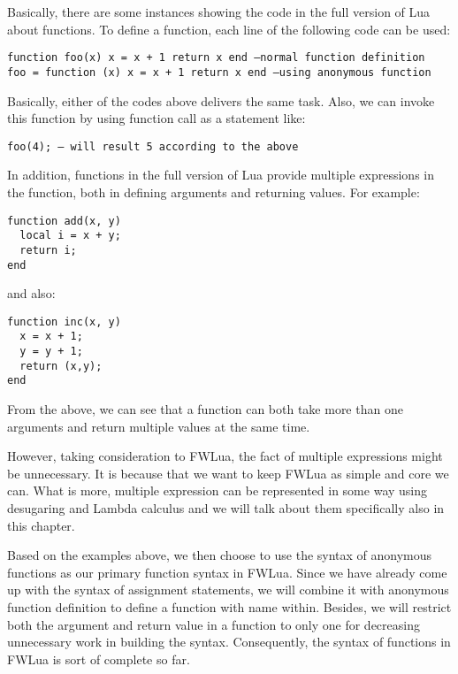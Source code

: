 Basically, there are some instances showing the code in the full version of Lua about functions. To define a function, each line of the following code can be used:
\begin{flushleft}
\tt function foo(x) x = x + 1 return x end --normal function definition\\
\tt foo = function (x) x = x + 1 return x end --using anonymous function\\
\end{flushleft}
Basically, either of the codes above delivers the same task. Also, we can invoke this function by using function call as a statement like:
\begin{flushleft}
\tt foo(4); -- will result 5 according to the above \\
\end{flushleft}
In addition, functions in the full version of Lua provide multiple expressions in the function, both in defining arguments and returning values. For example:
\begin{flushleft}
\tt function add(x, y) \\
\tt ~~local i = x + y;\\
\tt ~~return i;\\
\tt end\\
\end{flushleft}
and also:
\begin{flushleft}
\tt function inc(x, y) \\
\tt ~~x = x + 1;\\
\tt ~~y = y + 1;\\
\tt ~~return (x,y);\\
\tt end\\
\end{flushleft}
From the above, we can see that a function can both take more than one arguments and return multiple values at the same time.

However, taking consideration to FWLua, the fact of multiple expressions might be unnecessary. It is because that we want to keep FWLua as simple and core we can. What is more, multiple expression can be represented in some way using desugaring and Lambda calculus and we will talk about them specifically also in this chapter.

Based on the examples above, we then choose to use the syntax of anonymous functions as our primary function syntax in FWLua. Since we have already come up with the syntax of assignment statements, we will combine it with anonymous function definition to define a function with name within. Besides, we will restrict both the argument and return value in a function to only one for decreasing unnecessary work in building the syntax. Consequently, the syntax of functions in FWLua is sort of complete so far.

